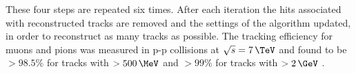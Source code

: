 These four steps are repeated six times. After each iteration
the hits associated with reconstructed tracks are removed and the settings
of the algorithm updated, in order to reconstruct as many
tracks as possible. The tracking efficiency for muons and pions was measured in p-p
collisions at $\sqrt{s} = 7\,\TeV$ and found to be $ > 98.5\%$ for tracks
with \pT $ > 500\,\MeV$ and $ > 99 \%$ for tracks with \pT $ > 2\,\GeV$ \cite{cms-trk-7tev}.

